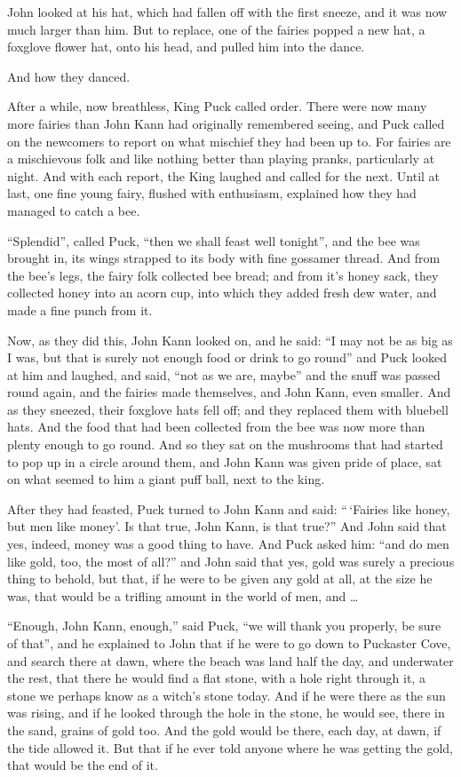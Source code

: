 \documentclass[
  12pt,
  a5paper,
  twoside]{book}
\begin{document}
John looked at his hat, which had fallen off with the first sneeze, and
it was now much larger than him. But to replace, one of the fairies
popped a new hat, a foxglove flower hat, onto his head, and pulled him
into the dance.

And how they danced.

After a while, now breathless, King Puck called order. There were now
many more fairies than John Kann had originally remembered seeing, and
Puck called on the newcomers to report on what mischief they had been up
to. For fairies are a mischievous folk and like nothing better than
playing pranks, particularly at night. And with each report, the King
laughed and called for the next. Until at last, one fine young fairy,
flushed with enthusiasm, explained how they had managed to catch a bee.

``Splendid'', called Puck, ``then we shall feast well tonight'', and the
bee was brought in, its wings strapped to its body with fine gossamer
thread. And from the bee's legs, the fairy folk collected bee bread; and
from it's honey sack, they collected honey into an acorn cup, into which
they added fresh dew water, and made a fine punch from it.

Now, as they did this, John Kann looked on, and he said: ``I may not be
as big as I was, but that is surely not enough food or drink to go
round'' and Puck looked at him and laughed, and said, ``not as we are,
maybe'' and the snuff was passed round again, and the fairies made
themselves, and John Kann, even smaller. And as they sneezed, their
foxglove hats fell off; and they replaced them with bluebell hats. And
the food that had been collected from the bee was now more than plenty
enough to go round. And so they sat on the mushrooms that had started to
pop up in a circle around them, and John Kann was given pride of place,
sat on what seemed to him a giant puff ball, next to the king.

After they had feasted, Puck turned to John Kann and said: ``\,`Fairies
like honey, but men like money'. Is that true, John Kann, is that
true?'' And John said that yes, indeed, money was a good thing to have.
And Puck asked him: ``and do men like gold, too, the most of all?'' and
John said that yes, gold was surely a precious thing to behold, but
that, if he were to be given any gold at all, at the size he was, that
would be a trifling amount in the world of men, and \ldots{}

``Enough, John Kann, enough,'' said Puck, ``we will thank you properly,
be sure of that'', and he explained to John that if he were to go down
to Puckaster Cove, and search there at dawn, where the beach was land
half the day, and underwater the rest, that there he would find a flat
stone, with a hole right through it, a stone we perhaps know as a
witch's stone today. And if he were there as the sun was rising, and if
he looked through the hole in the stone, he would see, there in the
sand, grains of gold too. And the gold would be there, each day, at
dawn, if the tide allowed it. But that if he ever told anyone where he
was getting the gold, that would be the end of it.
\end{document}
